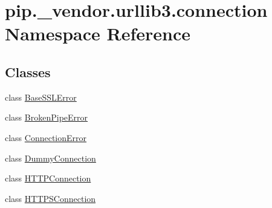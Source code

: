 \hypertarget{namespacepip_1_1__vendor_1_1urllib3_1_1connection}{}\section{pip.\+\_\+vendor.\+urllib3.\+connection Namespace Reference}
\label{namespacepip_1_1__vendor_1_1urllib3_1_1connection}
\subsection*{Classes}
\begin{DoxyCompactItemize}
\item 
class \hyperlink{classpip_1_1__vendor_1_1urllib3_1_1connection_1_1BaseSSLError}{Base\+S\+S\+L\+Error}
\item 
class \hyperlink{classpip_1_1__vendor_1_1urllib3_1_1connection_1_1BrokenPipeError}{Broken\+Pipe\+Error}
\item 
class \hyperlink{classpip_1_1__vendor_1_1urllib3_1_1connection_1_1ConnectionError}{Connection\+Error}
\item 
class \hyperlink{classpip_1_1__vendor_1_1urllib3_1_1connection_1_1DummyConnection}{Dummy\+Connection}
\item 
class \hyperlink{classpip_1_1__vendor_1_1urllib3_1_1connection_1_1HTTPConnection}{H\+T\+T\+P\+Connection}
\item 
class \hyperlink{classpip_1_1__vendor_1_1urllib3_1_1connection_1_1HTTPSConnection}{H\+T\+T\+P\+S\+Connection}
\end{DoxyCompactItemize}

